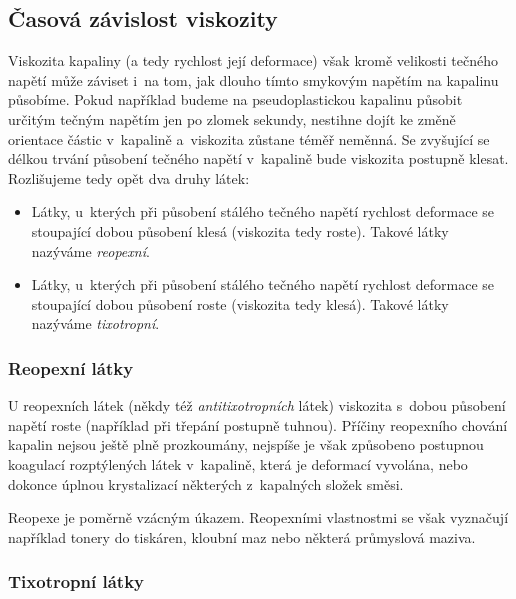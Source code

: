 \documentclass[12pt]{article}
\begin{document}
\subsection{Časová závislost viskozity}%

Viskozita kapaliny (a tedy rychlost její deformace) však kromě velikosti tečného napětí může záviset i~na tom, jak dlouho tímto smykovým napětím na kapalinu působíme. Pokud například budeme na pseudoplastickou kapalinu působit určitým tečným napětím jen po zlomek sekundy, nestihne dojít ke změně orientace částic v~kapalině a~viskozita zůstane téměř neměnná. Se zvyšující se délkou trvání působení tečného napětí v~kapalině bude viskozita postupně klesat. Rozlišujeme tedy opět dva druhy látek:
\begin{itemize}[noitemsep, topsep = 0pt]
    \item Látky, u~kterých při působení stálého tečného napětí rychlost deformace se stoupající dobou působení klesá (viskozita tedy roste). Takové látky nazýváme \emph{reopexní}.
    \item Látky, u~kterých při působení stálého tečného napětí rychlost deformace se stoupající dobou působení roste (viskozita tedy klesá). Takové látky nazýváme \emph{tixotropní}.
\end{itemize}

\subsubsection{Reopexní látky}%

U reopexních látek (někdy též \emph{antitixotropních} látek) viskozita s~dobou působení napětí roste (například při třepání postupně tuhnou). Příčiny reopexního chování kapalin nejsou ještě plně prozkoumány, nejspíše je však způsobeno postupnou koagulací rozptýlených látek v~kapalině, která je deformací vyvolána, nebo dokonce úplnou krystalizací některých z~kapalných složek směsi.~\cite{Article:Thixotropy}\cite{wiki:Time-dependent_viscosity}
\par
Reopexe je poměrně vzácným úkazem. Reopexními vlastnostmi se však vyznačují například tonery do tiskáren, kloubní maz nebo některá průmyslová maziva.~\cite{wiki:Rheopecty}

\subsubsection{Tixotropní látky}%
\end{document}
